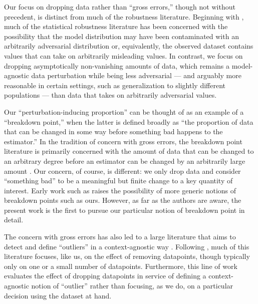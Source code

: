 Our focus on dropping data rather than ``gross errors,'' though not without
precedent, is distinct from much of the robustness literature.  Beginning with
\citet{huber:1964:robustlocation}, much of the statistical robustness literature
has been concerned with the possibility that the model distribution may have
been contaminated with an arbitrarily adversarial distribution or, equivalently,
the observed dataset contains values that can take on arbitrarily misleading
values. In contrast, we focus on dropping asymptotically non-vanishing amounts
of data, which remains a model-agnostic data perturbation while being less
adversarial --- and arguably more reasonable in certain settings, such as
generalization to slightly different populations --- than data that takes on
arbitrarily adversarial values.

Our ``perturbation-inducing proportion'' can be thought of as an example of a
``breakdown point,'' when the latter is defined broadly as ``the proportion of
data that can be changed in some way before something bad happens to the
estimator.''  In the tradition of concern with gross errors, the breakdown point
literature is primarily concerned with the amount of data that can be changed to
an arbitrary degree before an estimator can be changed by an arbitrarily large
amount \citep[chapter 1.2.5]{huber1981robust}.  Our concern, of course, is
different: we only drop data and consider ``something bad'' to be a meaningful
but finite change to a key quantity of interest. Early work such as
\citet{huber:1983:notion} raises the possibility of more generic notions of
breakdown points such as ours. However, as far as the authors are aware, the
present work is the first to pursue our particular notion of breakdown point in
detail.

The concern with gross errors has also led to a large literature that aims to
detect and define ``outliers'' in a context-agnostic way
\citep[e.g.][]{belsley:1980:regression,cook:1982:residualsandinfluenceinregression,cook:1986:assessment,kempthorne:1986:decision,carlin:1991:expectedutilityinfluence}.
Following \citet{cook:1977:detectionofinfluential}, much of this literature
focuses, like us, on the effect of removing datapoints, though typically only on
one or a small number of datapoints.  Furthermore, this line of work evaluates
the effect of dropping datapoints in service of defining a context-agnostic
notion of ``outlier'' rather than focusing, as we do, on a particular decision
using the dataset at hand.

